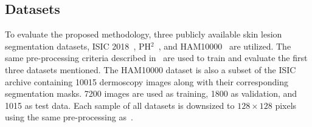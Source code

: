 \documentclass[runningheads]{llncs}
\begin{document}
\subsection{Datasets}
To evaluate the proposed methodology, three publicly available skin lesion segmentation datasets, ISIC 2018~\cite{codella2019skin}, PH$^2$~\cite{mendoncca2013ph}, and HAM10000~\cite{tschandl2018ham10000} are utilized. The same pre-processing criteria described in~\cite{azad2022transnorm} are used to train and evaluate the first three datasets mentioned. The HAM10000 dataset is also a subset of the ISIC archive containing 10015 dermoscopy images along with their corresponding segmentation masks. 7200 images are used as training, 1800 as validation, and 1015 as test data. Each sample of all datasets is downsized to $128\times128$ pixels using the same pre-processing as~\cite{alom2018recurrent}.
\end{document}
